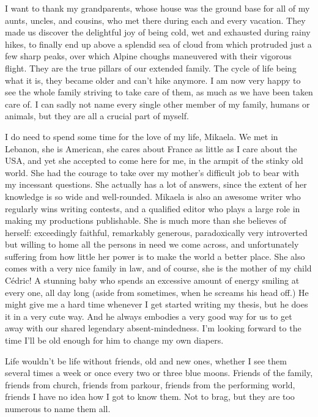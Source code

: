 I want to thank my grandparents, whose house was the ground base for all of my aunts, uncles, and cousins, who met there during each and every vacation. They made us discover the delightful joy of being cold, wet and exhausted during rainy hikes, to finally end up above a splendid sea of cloud from which protruded just a few sharp peaks, over which Alpine choughs maneuvered with their vigorous flight. They are the true pillars of our extended family. The cycle of life being what it is, they became older and can't hike anymore. I am now very happy to see the whole family striving to take care of them, as much as we have been taken care of. I can sadly not name every single other member of my family, humans or animals, but they are all a crucial part of myself. 

I do need to spend some time for the love of my life, Mikaela. We met in Lebanon, she is American, she cares about France as little as I care about the USA, and yet she accepted to come here for me, in the armpit of the stinky old world. She had the courage to take over my mother's difficult job to bear with my incessant questions. She actually has a lot of answers, since the extent of her knowledge is so wide and well-rounded. Mikaela is also an awesome writer who regularly wins writing contests, and a qualified editor who plays a large role in making my productions publishable. She is much more than she believes of herself: exceedingly faithful, remarkably generous, paradoxically very introverted but willing to home all the persons in need we come across, and unfortunately suffering from how little her power is to make the world a better place. She also comes with a very nice family in law, and of course, she is the mother of my child Cédric! A stunning baby who spends an excessive amount of energy smiling at every one, all day long (aside from sometimes, when he screams his head off.) He might give me a hard time whenever I get started writing my thesis, but he does it in a very cute way. And he always embodies a very good way for us to get away with our shared legendary absent-mindedness. I'm looking forward to the time I'll be old enough for him to change my own diapers.

Life wouldn't be life without friends, old and new ones, whether I see them several times a week or once every two or three blue moons. Friends of the family, friends from church, friends from parkour, friends from the performing world, friends I have no idea how I got to know them. Not to brag, but they are too numerous to name them all. 

